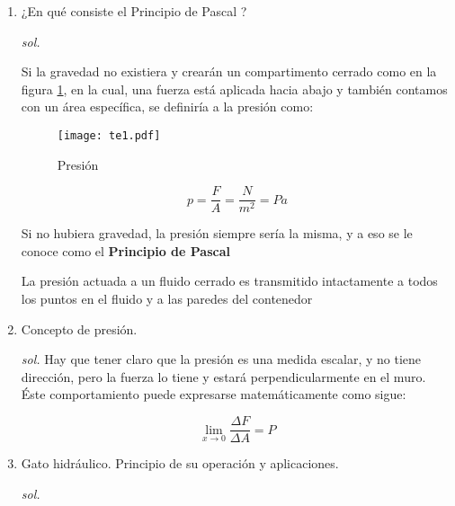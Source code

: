 \begin{enumerate}
    
    \item ¿En qué consiste el Principio de Pascal ?
    
    \textit{sol. }

Si la gravedad no existiera y crearán un compartimento cerrado como en la figura \ref{te1}, en la cual, una fuerza está aplicada hacia abajo y también contamos con un área específica, se definiría a la presión como: 
\begin{figure}[h!]
  \centering
  \texttt{[image: te1.pdf]}
  \caption{Presión}
  \label{te1}
\end{figure}

\begin{equation}
    p=\frac{F}{A}=\frac{N}{m^2}=Pa
\end{equation}

Si no hubiera gravedad, la presión siempre sería la misma, y a eso se le conoce como el \textbf{Principio de Pascal}

\begin{definition}
    La presión actuada a un fluido cerrado es transmitido intactamente a todos los puntos en el fluido y a las paredes del contenedor
\end{definition}


    \item Concepto de presión.
    
    \textit{sol. }
    Hay que tener claro que la presión es una medida escalar, y no tiene dirección, pero la fuerza lo tiene y estará perpendicularmente en el muro. Éste comportamiento puede expresarse matemáticamente como sigue:

\begin{equation}
    \lim_{x\to 0}\frac{\Delta F}{\Delta A}=P
\end{equation}
    \item Gato hidráulico. Principio de su operación y aplicaciones.
    
    \textit{sol. }
    

\end{enumerate}
